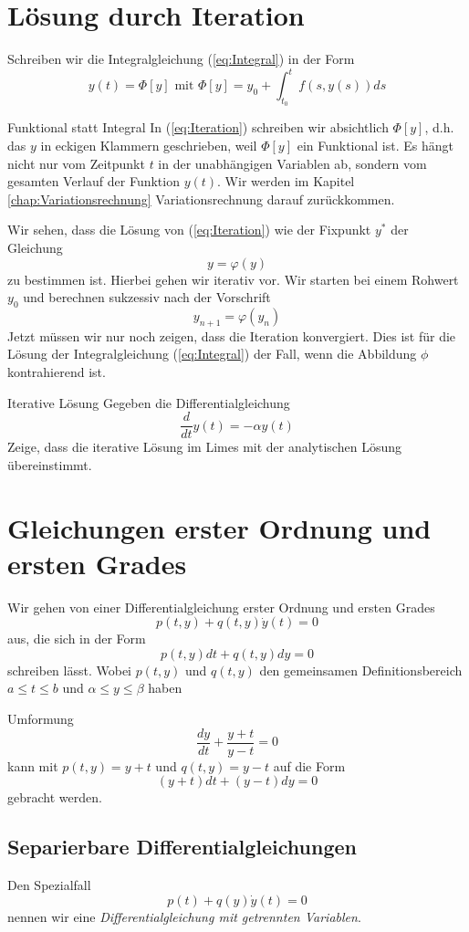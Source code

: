 \section{Lösung durch Iteration}
Schreiben wir die Integralgleichung (\ref{eq:Integral}) in der Form
\begin{equation}
  y(t)=\Phi[y]\mbox{ mit } \Phi[y]=y_0+\int_{t_0}^t f(s,y(s))ds
  \label{eq:Iteration}
\end{equation}
\begin{note}{Funktional statt Integral}
  In (\ref{eq:Iteration}) schreiben wir absichtlich $\Phi[y]$, d.h. das $y$ in
  eckigen Klammern geschrieben, weil $\Phi[y]$ ein Funktional ist. Es hängt
  nicht nur vom Zeitpunkt $t$ in der unabhängigen Variablen ab, sondern vom
  gesamten Verlauf der Funktion $y(t)$. Wir werden im Kapitel \ref{chap:Variationsrechnung}
  Variationsrechnung darauf zurückkommen. 
\end{note}
Wir sehen, dass die Lösung von (\ref{eq:Iteration}) wie der Fixpunkt $y^*$ der
Gleichung \[ y=\varphi(y)\] zu bestimmen ist. Hierbei gehen wir iterativ vor.
Wir starten bei einem Rohwert $y_0$ und berechnen sukzessiv nach der Vorschrift
\[ y_{n+1} = \varphi(y_n) \] 
Jetzt müssen wir nur noch zeigen, dass die Iteration konvergiert. Dies ist für
die Lösung der Integralgleichung (\ref{eq:Integral}) der Fall, wenn die
Abbildung $\phi$ kontrahierend ist.
\begin{example}{Iterative Lösung}
Gegeben die Differentialgleichung
\[
  \frac{d}{dt}y(t)=-\alpha y(t) 
\]
Zeige, dass die iterative Lösung im Limes mit der analytischen Lösung
übereinstimmt.
\end{example}
\section{Gleichungen erster Ordnung und ersten Grades}
Wir gehen von einer Differentialgleichung erster Ordnung und ersten Grades 
\[   p(t,y)+q(t,y)\dot{y}(t)=0 \]
aus, die sich in der Form
\begin{equation}\label{eq:DGLVarKoeff}
  p(t,y)dt+q(t,y)dy=0
\end{equation}
schreiben lässt. Wobei $p(t,y)$ und $q(t,y)$ den gemeinsamen Definitionsbereich
$a\le t\le b$ und $\alpha\le y\le\beta$ haben
\begin{example}{Umformung}
  \[\frac{dy}{dt}+\frac{y+t}{y-t}=0\]
  kann mit $p(t,y)=y+t$ und $q(t,y)=y-t$ auf die Form
  \[(y+t)dt+(y-t)dy=0\]
  gebracht werden.
\end{example}
\subsection{Separierbare Differentialgleichungen}
Den Spezialfall
\begin{equation}
  p(t)+q(y)\dot{y}(t)=0
  \label{eq:getrennteVar}
\end{equation}
nennen wir eine {\it Differentialgleichung mit getrennten Variablen}.

